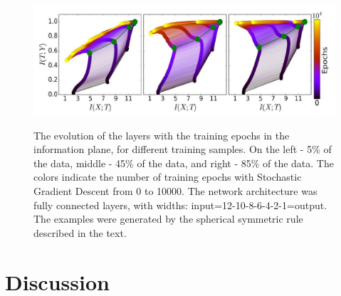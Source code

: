 \documentclass[twocolumn,superscriptaddress,aps]{revtex4-1}
\begin{document}
\begin{figure}[!htb]
\includegraphics[width=\textwidth, height=\textheight, keepaspectratio]{figs/overfitting.jpeg}
\label{fig:overfitting}
\caption{The evolution of the layers with the training epochs in the information plane, for different training samples. On the left - 5\% of the data, middle - 45\% of the data, and right - 85\% of
the data. The colors indicate the number of training epochs with Stochastic Gradient Descent from 0 to 10000. The network architecture was fully connected layers, with widths:
input=12-10-8-6-4-2-1=output. The examples were generated by the spherical symmetric
rule described in the text. }
\end{figure}

\section{Discussion}
\end{document}
